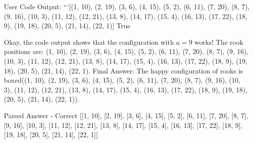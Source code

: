 \begin{prompt}{User}
Code Output:
```[(1, 10), (2, 19), (3, 6), (4, 15), (5, 2), (6, 11), (7, 20), (8, 7), (9, 16), (10, 3), (11, 12), (12, 21), (13, 8), (14, 17), (15, 4), (16, 13), (17, 22), (18, 9), (19, 18), (20, 5), (21, 14), (22, 1)]
True
\end{prompt}
    
\begingroup\raggedleft
\begin{geminils}{\geminiflheader}
Okay, the code output shows that the configuration with $a=9$ works!
The rook positions are: (1, 10), (2, 19), (3, 6), (4, 15), (5, 2), (6, 11), (7, 20), (8, 7), (9, 16), (10, 3), (11, 12), (12, 21), (13, 8), (14, 17), (15, 4), (16, 13), (17, 22), (18, 9), (19, 18), (20, 5), (21, 14), (22, 1).
Final Answer: The happy configuration of rooks is \\boxed{((1, 10), (2, 19), (3, 6), (4, 15), (5, 2), (6, 11), (7, 20), (8, 7), (9, 16), (10, 3), (11, 12), (12, 21), (13, 8), (14, 17), (15, 4), (16, 13), (17, 22), (18, 9), (19, 18), (20, 5), (21, 14), (22, 1))}.
\end{geminils}
\endgroup


\begin{parsecheckcorrect}{Parsed Answer - Correct}
[[1, 10], [2, 19], [3, 6], [4, 15], [5, 2], [6, 11], [7, 20], [8, 7], [9, 16], [10, 3], [11, 12], [12, 21], [13, 8], [14, 17], [15, 4], [16, 13], [17, 22], [18, 9], [19, 18], [20, 5], [21, 14], [22, 1]]
\end{parsecheckcorrect}
